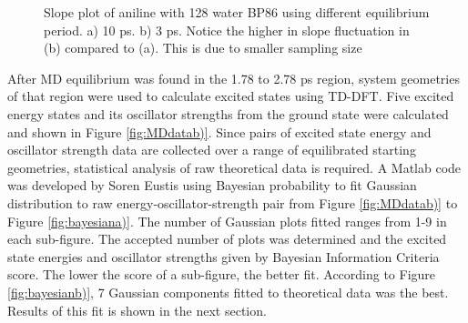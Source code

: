 \documentclass[
journal=jpcbfk, %
manuscript=article]{achemso}
\begin{document}
\begin{figure}[tbp]
	\centering
	\label{fig:slopePlot}
	\begin{subfigure}[b]{0.49\textwidth}
		\caption{}
		\label{fig:slopePlota)}
	\end{subfigure}
	\hfill
	\begin{subfigure}[b]{0.49\textwidth}
		\caption{}
		\label{fig:slopePlotb)}
	\end{subfigure}
	\caption{Slope plot of aniline with 128 water BP86 using different equilibrium period. a) 10 ps. b) 3 ps. Notice the higher in slope fluctuation in (b) compared to (a). This is due to smaller sampling size}
\end{figure}

 After MD equilibrium was found in the 1.78 to 2.78 ps region, system geometries of that region were used to calculate excited states using TD-DFT. Five excited energy states and its oscillator strengths from the ground state were calculated and shown in Figure \ref{fig:MDdatab)}. Since pairs of excited state energy and oscillator strength data are collected over a range of equilibrated starting geometries, statistical analysis of raw theoretical data is required. A Matlab code was developed by Soren Eustis using Bayesian probability to fit Gaussian distribution to raw energy-oscillator-strength pair from Figure \ref{fig:MDdatab)} to Figure \ref{fig:bayesiana)}. The number of Gaussian plots fitted ranges from 1-9 in each sub-figure. The accepted number of plots was determined and the excited state energies and oscillator strengths given by Bayesian Information Criteria score. The lower the score of a sub-figure, the better fit. According to Figure \ref{fig:bayesianb)}, 7 Gaussian components fitted to theoretical data was the best. Results of this fit is shown in the next section. 
\end{document}
